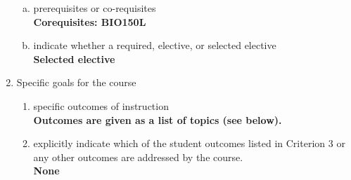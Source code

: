\begin{enumerate}[1.]
\begin{enumerate}[a.]
\item prerequisites or co-requisites\\
  {\bfseries
    Corequisites: BIO150L
  }

\item indicate whether a required, elective, or selected elective\\ %
  {\bfseries
    Selected elective
  }

\end{enumerate}

\item Specific goals for the course
\begin{enumerate}
\item specific outcomes of instruction\\ %
  {\bfseries
    Outcomes are given as a list of topics (see below).
  }

\item explicitly indicate which of the student outcomes listed in Criterion 3 or any other outcomes are addressed by the course.\\
  {\bfseries
    None
  }
\end{enumerate}


\end{enumerate}
